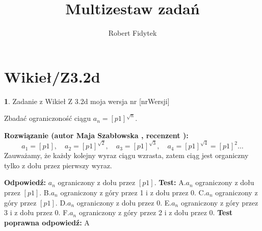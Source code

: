 \documentclass[12pt, a4paper]{article}
\title{Multizestaw zadań}
\author{Robert Fidytek}
\date{}
\theoremstyle{definition} %
\newtheorem{zad}{}
\newcommand{\kategoria}[1]{\section{#1}} %
\newcommand{\zadStart}[1]{\begin{zad}#1\newline} %
\newcommand{\zadStop}{\end{zad}}   %
\newcommand{\rozwStart}[2]{\noindent \textbf{Rozwiązanie (autor #1 , recenzent #2): }\newline} %
\newcommand{\rozwStop}{\newline}                                            %
\newcommand{\odpStart}{\noindent \textbf{Odpowiedź:}\newline}    %
\newcommand{\odpStop}{\newline}                                             %
\newcommand{\testStart}{\noindent \textbf{Test:}\newline} %
\newcommand{\testStop}{\newline} %
\newcommand{\kluczStart}{\noindent \textbf{Test poprawna odpowiedź:}\newline} %
\newcommand{\kluczStop}{\newline} %
\begin{document}
\maketitle


\kategoria{Wikieł/Z3.2d}
\zadStart{Zadanie z Wikieł Z 3.2d moja wersja nr [nrWersji]}


Zbadać ograniczoność ciągu $a_{n}=[p1]^{\sqrt{n}}.$
\zadStop

\rozwStart{Maja Szabłowska}{}
$$a_{1}=[p1], \quad a_{2}=[p1]^{\sqrt{2}}, \quad a_{3}=[p1]^{\sqrt{3}}, \quad a_{4}=[p1]^{\sqrt{4}}=[p1]^{2} \ldots$$
Zauważamy, że każdy kolejny wyraz ciągu wzrasta, zatem ciąg jest organiczny tylko z dołu przez pierwszy wyraz.
\rozwStop


\odpStart
$a_{n}$ ograniczony z dołu przez $[p1]$.
\odpStop
\testStart
A.$a_{n}$ ograniczony z dołu przez $[p1]$.
B.$a_{n}$ ograniczony z góry przez 1 i z dołu przez 0.
C.$a_{n}$ ograniczony z góry przez $[p1]$.
D.$a_{n}$ ograniczony z dołu przez 0.
E.$a_{n}$ ograniczony z góry przez 3 i z dołu przez 0.
F.$a_{n}$ ograniczony z góry przez 2 i z dołu przez 0.
\testStop
\kluczStart
A
\kluczStop
\end{document}
